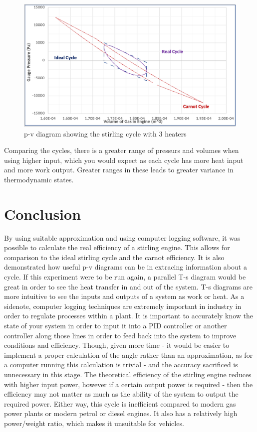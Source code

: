 \documentclass[12pt]{article}
\begin{document}
        \begin{figure}[H]
            \captionsetup{labelfont=bf}
            \includegraphics[width=40pc]{cycle3.png}
            \caption{p-v diagram showing the stirling cycle with 3 heaters}\label{cycle3}
        \end{figure}
        Comparing the cycles, there is a greater range of pressurs and volumes when using higher input, which you would expect as each cycle has more heat input and more work output.
        Greater ranges in these leads to greater variance in thermodynamic states. 
    \section{Conclusion}
        By using suitable approximation and using computer logging software, it was possible to calculate the real efficiency of a stirling engine. This allows for comparison
        to the ideal stirling cycle and the carnot efficiency. It is also demonstrated how useful p-v diagrams can be in extracing information about a cycle. If this experiment
        were to be run again, a parallel T-s diagram would be great in order to see the heat transfer in and out of the system. T-s diagrams are more intuitive to see the inputs
        and outputs of a system as work or heat. As a sidenote, computer logging techniques are extremely important in industry in order to regulate processes within a plant.
        It is important to accurately know the state of your system in order to input it into a PID controller or another controller along those lines in order to feed back
        into the system to improve conditions and efficiency. Though, given more time - it would be easier to implement a proper calculation of the angle rather than an approximation,
        as for a computer running this calculation is trivial - and the accuracy sacrificed is unnecessary in this stage. The theoretical efficiency of the stirling engine reduces
        with higher input power, however if a certain output power is required - then the efficiency may not matter as much as the ability of the system to output the required power.
         Either way, this cycle is inefficient compared to modern gas power plants or modern petrol or diesel engines. It also has a relatively high power/weight ratio, which makes
         it unsuitable for vehicles. 
    
\end{document}
